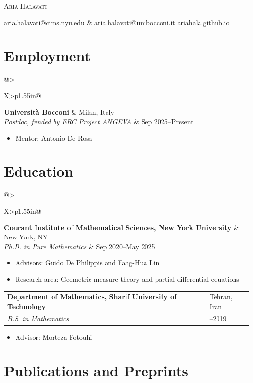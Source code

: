 \documentclass[10pt,letterpaper]{article}
\makeatletter
\newcommand{\headername}[1]{%
  {\fontsize{24}{28}\selectfont\scshape #1}\par
}
\newcommand{\contactline}[1]{%
  {\small\color{cvgray}#1}\par
}
\newcommand{\entry}[4]{%
  \begin{tabularx}{\linewidth}{@{}>{\raggedright\arraybackslash}X>{\raggedleft\arraybackslash}p{1.55in}@{}}
    \textbf{#1} & #2 \\
    \textit{#3} & #4 \\
  \end{tabularx}
}
\makeatother
\begin{document}
\begin{center}
  \headername{Aria Halavati}
  \vspace{0.25em}
  \contactline{\href{mailto:aria.halavati@cims.nyu.edu}{aria.halavati@cims.nyu.edu} \&   \href{mailto:aria.halavati@unibocconi.it}{aria.halavati@unibocconi.it}\quad\textbar\quad
  \href{https://ariahala.github.io}{ariahala.github.io}}
\end{center}

\vspace{0.35em}

\section*{Employment}

\entry{Universit\`a Bocconi}{Milan, Italy}{Postdoc, funded by ERC Project ANGEVA}{Sep 2025--Present}
\begin{itemize}
  \item Mentor: Antonio De Rosa
\end{itemize}

\section*{Education}

\entry{Courant Institute of Mathematical Sciences, New York University}{New York, NY}{Ph.D. in Pure Mathematics}{Sep 2020--May 2025}
\begin{itemize}
  \item Advisors: Guido De Philippis and Fang-Hua Lin
  \item Research area: Geometric measure theory and partial differential equations
\end{itemize}

\vspace{0.25em}
\entry{Department of Mathematics, Sharif University of Technology}{Tehran, Iran}{B.S. in Mathematics}{2015--2019}
\begin{itemize}
  \item Advisor: Morteza Fotouhi
\end{itemize}

\section*{Publications and Preprints}
\end{document}
